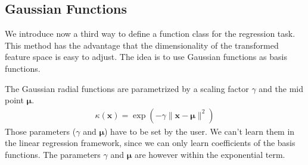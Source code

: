 \documentclass[letterpaper,10pt,english]{jupyterBook}
\begin{document}
\subsection{Gaussian Functions}
\label{\detokenize{regression_functions:gaussian-functions}}
\sphinxAtStartPar
We introduce now a third way to define a function class for the regression task. This method has the advantage that the dimensionality of the transformed feature space is easy to adjust. The idea is to use Gaussian functions as basis functions.
\begin{center}\end{center}
\sphinxAtStartPar
The Gaussian radial functions are parametrized by a scaling factor \(\gamma\) and the mid point \(\bm\mu\).\begin{equation*}
\begin{split}
    \kappa(\mathbf{x})=\exp\left(-\gamma\lVert\mathbf{x}-\bm\mu\rVert^2\right)
\end{split}
\end{equation*}
Those parameters (\(\gamma\) and \(\bm\mu\)) have to be set by the user. We can’t learn them in the linear regression framework, since we can only learn coefficients of the basis functions. The parameters \(\gamma\) and \(\bm\mu\) are however within the exponential term.
\label{regression_functions:example-5}
\end{document}
